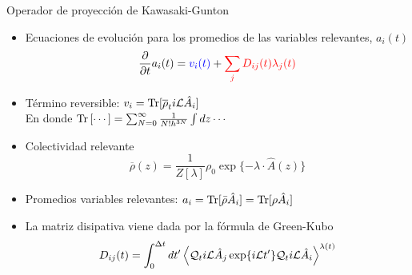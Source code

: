 \documentclass{beamer}
\begin{document}
\begin{frame}{Operador de proyección de Kawasaki-Gunton}
  \begin{itemize}
    \item<1-> Ecuaciones de evolución para los promedios de las variables relevantes, $a_i(t)$
\begin{equation}
  \frac{\partial}{\partial t}a_i(t) = {\color{blue} v_i(t)}+ {\color{red} \sum_j D_{ij}(t) \lambda_j(t)}
\nonumber
\end{equation}
\item<2-> {\color{blue} Término reversible}: 
  $v_i={\rm Tr}[\overline{\rho}_t i{\cal L}\hat{A}_i]$
  \\En donde 
  ${\rm Tr}\left[\cdots\right]=\sum_{N=0}^\infty \frac{1}{N!h^{3N}}
\int dz\cdots$
\item<3-> Colectividad relevante 
  \begin{equation}
  \overline{\rho}(z) = \frac{1}{Z[\lambda]} \rho_0\exp\{-\lambda\!\cdot\!\hat{A}(z)\}
  \nonumber
  \end{equation}
\item<4-> Promedios variables relevantes: $a_i={\rm Tr}[\bar{\rho}\hat{A}_i]={\rm Tr}[\rho\hat{A}_i]$
\item<5-> {\color{red} La matriz disipativa} viene dada por la fórmula de  Green-Kubo
\begin{equation}
D_{ij}(t)=\int_0^{\Delta t} dt'\left\langle 
{\cal Q}_t i{\cal L}\hat{A}_j\exp\{i{\cal L}t'\}{\cal Q}_t i{\cal L}\hat{A}_i
\right\rangle^{\lambda(t)}
\label{dij}
\nonumber
\end{equation}
\end{itemize}
\end{frame}
\end{document}
